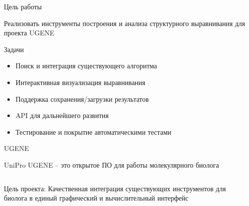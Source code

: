 \documentclass[utf8, professionalfonts]{beamer}
\begin{document}
\begin{frame}{Цель работы}
\begin{center}
\Large Реализовать инструменты построения и анализа структурного выравнивания для проекта UGENE
\end{center}
\vspace{11pt}
Задачи
\begin{itemize}
	\item Поиск и интеграция существующего алгоритма 
	\item Интерактивная визуализация выравнивания
	\item Поддержка сохранения/загрузки результатов 
	\item API для дальнейшего развития
	\item Тестирование и покрытие автоматическими тестами
\end{itemize}
\end{frame}

\begin{frame}{UGENE}
\begin{center}
\Large{UniPro UGENE -- это открытое ПО для работы молекулярного биолога}
\end{center}

\begin{columns}
	
	Цель проекта: Качественная интеграция существующих инструментов для биолога в единый графический и вычислительный интерфейс
	
\end{columns}
\end{frame}
\end{document}
